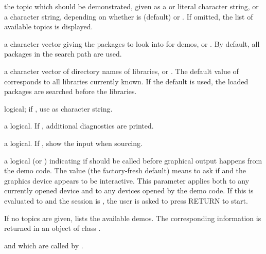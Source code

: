 %
\begin{Arguments}
\begin{ldescription}
\item[\code{topic}] the topic which should be demonstrated, given as a
 or literal character string, or a character string,
depending on whether  is  (default)
or .  If omitted, the list of available topics is
displayed.
\item[\code{package}] a character vector giving the packages to look into for
demos, or .  By default, all packages in the search path
are used.
\item[\code{lib.loc}] a character vector of directory names of \R{} libraries,
or .  The default value of  corresponds to all
libraries currently known.  If the default is used, the loaded
packages are searched before the libraries.
\item[\code{character.only}] logical; if , use  as
character string.
\item[\code{verbose}] a logical.  If , additional diagnostics are
printed.
\item[\code{echo}] a logical.  If , show the \R{} input when sourcing.
\item[\code{ask}] a logical (or ) indicating if
 should be called before
graphical output happens from the demo code.  The value
 (the factory-fresh default) means to ask if
 and the graphics device appears to be
interactive.  This parameter applies both to any currently opened
device and to any devices opened by the demo code.  If this is
evaluated to  and the session is , the
user is asked to press RETURN to start.
\end{ldescription}
\end{Arguments}
%
\begin{Details}\relax
If no topics are given,  lists the available demos.  The
corresponding information is returned in an object of class
.
\end{Details}
%
\begin{SeeAlso}\relax
{} and  which 
are called by .
\end{SeeAlso}
%
